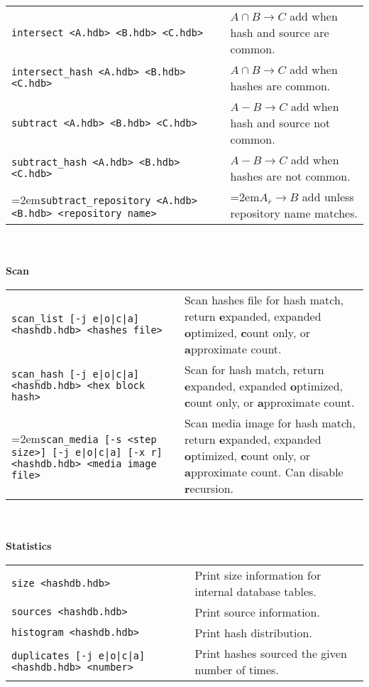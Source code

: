 \begin{footnotesize}
\begin{tabular}{p{3.6 in} p{3.0 in}}
\texttt{intersect <A.hdb> <B.hdb> <C.hdb>} & $A \cap B \rightarrow C$ add when hash and source are common.\\
\texttt{intersect\_hash <A.hdb> <B.hdb> <C.hdb>} & $A \cap B \rightarrow C$ add when hashes are common.\\
\texttt{subtract <A.hdb> <B.hdb> <C.hdb>} & $A - B \rightarrow C$ add when hash and source not common.\\
\texttt{subtract\_hash <A.hdb> <B.hdb> <C.hdb>} & $A - B \rightarrow C$ add when hashes are not common.\\
\hangindent=2em\texttt{subtract\_repository <A.hdb> <B.hdb> <repository name>} & \hangindent=2em$A_{\overline{r}} \rightarrow B$ add unless repository name matches.\\
\end{tabular}
\\
\\
\textbf{Scan} \\
\begin{tabular}{p{3.6 in} p{3.0 in}}
\texttt{scan\_list [-j e|o|c|a] <hashdb.hdb> <hashes file>} & Scan hashes file for hash match, return \textbf{e}xpanded, expanded \textbf{o}ptimized, \textbf{c}ount only, or \textbf{a}pproximate count.\\
\texttt{scan\_hash [-j e|o|c|a] <hashdb.hdb> <hex block hash>} & Scan for hash match, return \textbf{e}xpanded, expanded \textbf{o}ptimized, \textbf{c}ount only, or \textbf{a}pproximate count.\\
\hangindent=2em\texttt{scan\_media [-s <step size>] [-j e|o|c|a] [-x r] <hashdb.hdb> <media image file>} & Scan media image for hash match, return \textbf{e}xpanded, expanded \textbf{o}ptimized, \textbf{c}ount only, or \textbf{a}pproximate count. Can disable \textbf{r}ecursion.\\
\end{tabular}
\\
\\
\textbf{Statistics}\\
\begin{tabular}{p{3.6 in} p{3.0 in}}
\texttt{size <hashdb.hdb>} & Print size information for internal database tables.\\
\texttt{sources <hashdb.hdb>} & Print source information.\\
\texttt{histogram <hashdb.hdb>} & Print hash distribution.\\
\texttt{duplicates [-j e|o|c|a] <hashdb.hdb> <number>} & Print hashes sourced the given number of times.\\

\end{tabular}
\end{footnotesize}
